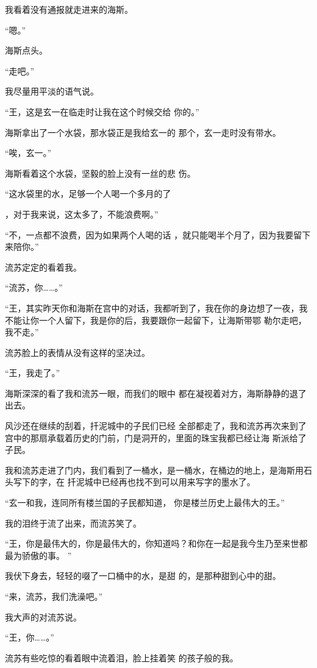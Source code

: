 \documentclass{article}
\begin{document}
我看着没有通报就走进来的海斯。 

\newpage


“嗯。” 


海斯点头。 


“走吧。” 


我尽量用平淡的语气说。 

“王，这是玄一在临走时让我在这个时候交给
你的。” 

海斯拿出了一个水袋，那水袋正是我给玄一的
那个，玄一走时没有带水。 


“唉，玄一。” 

海斯看着这个水袋，坚毅的脸上没有一丝的悲
伤。 

“这水袋里的水，足够一个人喝一个多月的了

\newpage
，对于我来说，这太多了，不能浪费啊。” 

“不，一点都不浪费，因为如果两个人喝的话
，就只能喝半个月了，因为我要留下来陪你。” 


流苏定定的看着我。 


“流苏，你……。” 

“王，其实昨天你和海斯在宫中的对话，我都听到了，我在你的身边想了一夜，我不能让你一个人留下，我是你的后，我要跟你一起留下，让海斯带鄂
勒尔走吧，我不走。” 


流苏脸上的表情从没有这样的坚决过。 


“王，我走了。” 

海斯深深的看了我和流苏一眼，而我们的眼中
都在凝视着对方，海斯静静的退了出去。 

风沙还在继续的刮着，扦泥城中的子民们已经
\newpage
全部都走了，我和流苏再次来到了宫中的那扇承载着历史的门前，门是洞开的，里面的珠宝我都已经让海
斯派给了子民。 

我和流苏走进了门内，我们看到了一桶水，是一桶水，在桶边的地上，是海斯用石头写下的字，在
扦泥城中已经再也找不到可以用来写字的墨水了。 

“玄一和我，连同所有楼兰国的子民都知道，
你是楼兰历史上最伟大的王。” 


我的泪终于流了出来，而流苏笑了。 

“王，你是最伟大的，你是最伟大的，你知道吗？和你在一起是我今生乃至来世都最为骄傲的事。
” 

我伏下身去，轻轻的啜了一口桶中的水，是甜
的，是那种甜到心中的甜。 


\newpage

“来，流苏，我们洗澡吧。” 


我大声的对流苏说。 


“王，你……。” 

流苏有些吃惊的看着眼中流着泪，脸上挂着笑
的孩子般的我。 
\end{document}
